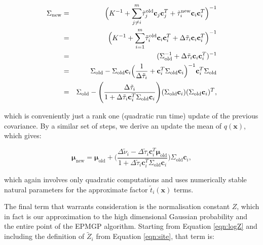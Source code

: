 \documentclass[twoside,11pt]{article}
\def\x{{\mathbf x}}
\def\c{{\mathbf c}}
\def\boldmu{\bm{\mu}}
\begin{document}
\begin{eqnarray}
\label{eqn:sigmanew}
\Sigma_{\mathrm{new}} & = & \Bigl(K^{-1} + \overset{m}{\sum_{j\ne i}} \tilde{\tau}_j^{\mathrm{old}}\c_j\c_j^T + \tilde{\tau}_i^{\mathrm{new}}\c_i\c_i^T \Bigr)^{-1} \\
& = & \Bigl(K^{-1} + \overset{m}{\sum_{i=1}} \tilde{\tau}_i^{\mathrm{old}}\c_i\c_i^T + \Delta\tilde{\tau}_i\c_i\c_i^T \Bigr)^{-1} \\
& = & (\Sigma_{\mathrm{old}}^{-1} + \Delta\tilde{\tau}_i\c_i\c_i^T )^{-1} \\
& = & \Sigma_{\mathrm{old}} - \Sigma_{\mathrm{old}} \c_i \Bigl(\frac{1}{\Delta\tilde{\tau}_i} + \c_i^T \Sigma_{\mathrm{old}} \c_i\Bigr)^{-1} \c_i^T\Sigma_{\mathrm{old}} \\
& = & \Sigma_{\mathrm{old}} - \Biggl(\frac{\Delta\tilde{\tau}_i }{ 1 +  \Delta\tilde{\tau}_i \c_i^T\Sigma_{\mathrm{old}}\c_i }\Biggr) (\Sigma_{\mathrm{old}} \c_i)(\Sigma_{\mathrm{old}} \c_i)^T,
\end{eqnarray}

\noindent which is conveniently just a rank one (quadratic run time) update of the previous covariance.  By a similar set of steps, we derive an update the mean of $q(\x)$, which gives:

\begin{equation}
\label{eqn:munew}
\boldmu_{\mathrm{new}} = \boldmu_{\mathrm{old}} +    \Biggl( \frac{\Delta\tilde{\nu}_i - \Delta\tilde{\tau}_i \c_i^T\boldmu_{\mathrm{old}} }{ 1 + \Delta\tilde{\tau}_i \c_i^T\Sigma_{\mathrm{old}} \c_i} \Biggr) \Sigma_{\mathrm{old}} \c_i,
\end{equation}

\noindent which again involves only quadratic computations and uses numerically stable natural parameters for the approximate factor $\tilde{t}_i(\x)$ terms.

The final term that warrants consideration is the normalisation constant $Z$, which in fact is our approximation to the high dimensional Gaussian probability and the entire point of the EPMGP algorithm.  Starting from Equation \ref{eqn:logZ} and including the definition of $\tilde{Z}_i$ from Equation \ref{eqn:site}, that term is:
\end{document}
